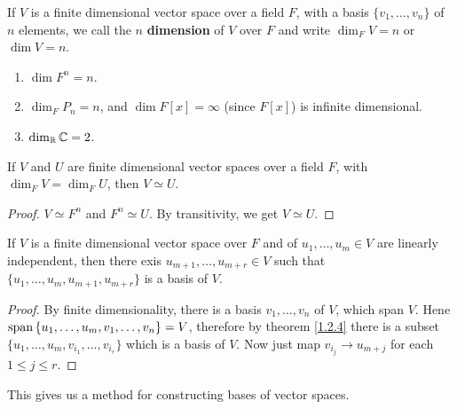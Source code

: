 \begin{definition}
    If $V$ is a finite dimensional vector space over a field  $F$, with a basis
     $\{v_1, \dots, v_n\}$ of $n$ elements, we call the $n$ \textbf{dimension} of
     $V$ over  $F$ and write $\dim_F{V}=n$ or $\dim{V}=n$.
\end{definition}

\begin{example}
    \begin{enumerate}[label=(\arabic*)]
        \item $\dim{F^n}=n$.

        \item $\dim_F{P_n}=n$, and $\dim{F[x]}=\infty$ (since $F[x]$) is
            infinite dimensional.

        \item $\operatorname{dim}_{\mathbb{R}}{\mathbb{C}}=2$.
    \end{enumerate}
\end{example} 

\begin{corollary}
    If $V$ and  $U$ are finite dimensional vector spaces over a field $F$, with
     $\dim_F{V}=\dim_F{U}$, then $V \simeq U$.
\end{corollary}
\begin{proof}
    $V \simeq F^n$ and  $F^n \simeq U$. By transitivity, we get  $V \simeq U$.
\end{proof}

\begin{lemma}\label{1.2.7}
    If $V$ is a finite dimensional vector space over $F$ and of  $ u_1, \dots,
    u_m \in V$ are linearly independent, then there exis $u_{m+1}, \dots,
    u_{m+r} \in V$ such that $\{u_1, \dots, u_m, u_{m+1}, u_{m+r}\}$ is a basis
    of $V$.
\end{lemma}
\begin{proof}
    By finite dimensionality, there is a basis $ v_1, \dots, v_n$ of $V$, which
    span  $V$. Hene  $\operatorname{span}{\{u_1, \dots, u_m,v_1, \dots, v_n\}}=V$,
    therefore by theorem \ref {1.2.4} there is a subset $\{u_1, \dots,
    u_m,v_{i_1}, \dots, v_{i_r}\}$ which is a basis of $V$. Now just map
    $v_{i_j} \rightarrow u_{m+j}$ for each $1 \leq j \leq r$.
\end{proof}
\begin{remark} 
    This gives us a method for constructing bases of vector spaces.
\end{remark}

